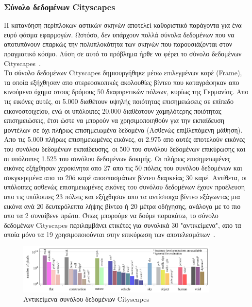\documentclass[12pt]{article}
\numberwithin{equation}{section}
\begin{document}
\subsubsection{Σύνολο δεδομένων Cityscapes}

Η κατανόηση περίπλοκων αστικών σκηνών αποτελεί καθοριστικό παράγοντα για ένα ευρύ φάσμα εφαρμογών. Ωστόσο, δεν υπάρχουν πολλά σύνολα δεδομένων που να αποτυπόνουν επαρκώς την πολυπλοκότητα των σκηνών που παρουσιάζονται στον πραγματικό κόσμο. Λύση σε αυτό το πρόβλημα ήρθε να φέρει το σύνολο δεδομένων Cityscapes~\cite{DBLP:journals/corr/CordtsORREBFRS16}. \\


Το σύνολο δεδομένων Cityscapes δημιουργήθηκε μέσω επιλεγμένων καρέ (Frame), τα οποία εξήχθησαν απο στερεοσκοπικές ακολουθίες βίντεο που καταγράφηκαν απο κινούμενο όχημα στους δρόμους 50 διαφορετικών πόλεων, κυρίως της Γερμανίας. Απο τις εικόνες αυτές, οι 5.000 διαθέτουν υψηλής ποιότητας επισημειώσεις σε επίπεδο εικονοστοιχείου, ενώ οι υπόλοιπες 20.000 διαθέοτουν χαμηλότερης ποιότητας επισημειώσεις, έτσι ώστε να μπορούν να χρησιμοποιηθούν για την εκπαίδευση μοντέλων σε όχι πλήρως επισημειωμένα δεδομένα (Ασθενώς επιβλεπόμενη μάθηση). Απο τις 5.000 πλήρως επισημειωμένες εικόνες, οι 2.975 απο αυτές αποτελούν εικόνες του συνόλου δεδομένων εκπαίδευσης, οι 500 του συνόλου δεδομένων επικύρωσης και οι υπόλοιπες 1.525 του συνόλου δεδομένων δοκιμής. Οι πλήρως επισημειωμένες εικόνες εξήχθησαν χεροκίνητα απο 27 απο τις 50 πόλεις του συνόλου δεδομένων και συκγκεριμένα απο το 20ό καρέ αποσπασμάτων βίντεο διαρκείας 30 καρέ. Αντίθετα, οι υπόλοιπες ασθενώς επισημειωμένες εικόνες του συνόλου δεδομένων έχουν προέλευση απο τις υπόλοιπες 23 πόλεις και εξήχθησαν απο τα αντίστοιχα βίντεο εξάγωντας μια εικόνα ανά 20 δευτερόλεπτα λήψης βίντεο ή 20 μέτρα οδήγησης, ανάλογα με το πιο απο τα 2 συναίβενε πρώτο. Όπως μπορούμε να δούμε παρακάτω, το σύνολο δεδομένων Cityscapes περιλαμβάνει ετικέτες για συνολικά 30 "αντικείμενα", απο τα οποία μόνο τα 19 χρησιμοποιούνται στην επικύρωση των αποτελεσμάτων~\cite{DBLP:journals/corr/CordtsORREBFRS16}.\\

\begin{figure}[h!]
  \centering
  \includegraphics[width=0.9\textwidth]{images/cityscapes_objects.png} %
  \caption{Αντικείμενα συνόλου δεδομένων Cityscapes}
  \label{figure 7}
\end{figure}
\end{document}
